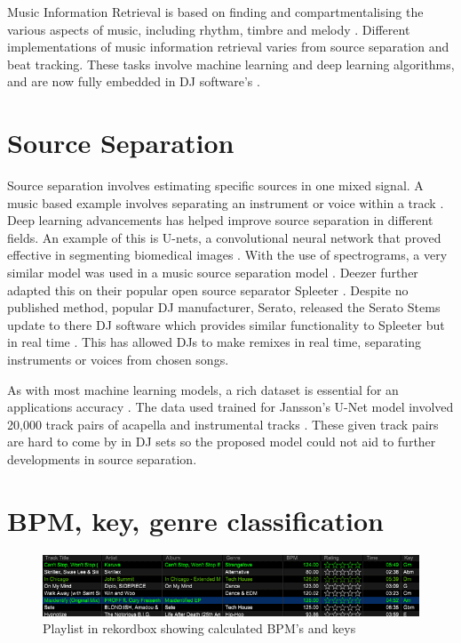 Music Information Retrieval is based on finding and compartmentalising the various aspects of music, including rhythm, timbre and melody \citep{orio_music_2006}. Different implementations of music information retrieval varies from source separation and beat tracking. These tasks involve machine learning and deep learning algorithms, and are now fully embedded in DJ software's \citep{rekordbox_rekordbox_2020}. 

\section{Source Separation}

Source separation involves estimating specific sources in one mixed signal. A music based example involves separating an instrument or voice within a track \citep{sgouros_efficient_2022}. Deep learning advancements has helped improve source separation in different fields. An example of this is U-nets, a convolutional neural network that proved effective in segmenting biomedical images \citep{ronneberger_u-net_2015}. With the use of spectrograms, a very similar model was used in a music source separation model \citep{jansson_singing_2017}. Deezer  further adapted this on their popular open source separator Spleeter \citep{hennequin_spleeter_2020}. Despite no published method, popular DJ manufacturer, Serato, released the Serato Stems update to there DJ software which provides similar functionality to Spleeter but in real time \citep{kirn_review_2023}. This has allowed DJs to make remixes in real time, separating instruments or voices from chosen songs.

As with most machine learning models, a rich dataset is essential for an applications accuracy \citep{jain_overview_2020}. The data used trained for Jansson's U-Net model involved 20,000 track pairs of acapella and instrumental tracks \citep{jansson_singing_2017}. These given track pairs are hard to come by in DJ sets so the proposed model could not aid to further developments in source separation.


\section{BPM, key, genre classification}

\begin{figure}[H]
	
	\includegraphics[scale=0.64]{images/rekordbox}
	\centering
	\caption{Playlist in rekordbox showing calculated BPM's and keys \citep{rekordbox_rekordbox_2023}} 
\end{figure}


